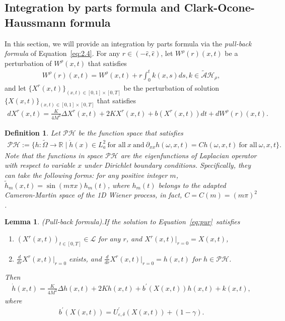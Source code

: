 \documentclass[11pt]{article}
\numberwithin{equation}{section}%
\numberwithin{figure}{section}%
\newtheorem{lemma}[theorem]{Lemma}
\newtheorem{definition}[theorem]{Definition}
\theoremstyle{remark}
\begin{document}
	\subsection{Integration by parts formula and Clark-Ocone-Haussmann formula}\label{sec:4.1}
	In this section, we will provide an integration by parts formula via the \emph{pull-back formula} of Equation~\eqref{eq:2.4}. For any $r\in(-\hat{\epsilon},\hat{\epsilon})$, let $W^{\rho}(r)(x,t)$ be a perturbation of $W^{\rho}(x,t)$ that satisfies
	\begin{align*}
		W^{\rho}(r)(x,t)=W^{\rho}(x,t)+r\int_{0}^{t}k(x,s)ds, k\in\tilde{\mathcal{A}}\mathcal{H}_{\rho},
	\end{align*}
	and let $\{X^{r}(x,t)\}_{(x,t)\in [0,1]\times [0,T]}$ be the perturbation of solution $\{X(x,t)\}_{(x,t)\in [0,1]\times [0,T]}$ that satisfies
	\begin{align}\label{eq:pur}
		d X^{r}(x,t)=\frac{K}{4M^{2}}\Delta X^{r}(x,t)+2K X^{r}(x,t)+b(X^{r}(x,t))dt+ dW^{\rho}(r)(x,t).
	\end{align}
	\begin{definition}\label{def:tanpro} 
		Let $ \mathcal{PH}$ be the function space that satisfies 
	\begin{align*}
		\mathcal{PH}:=\{h:\tilde{\Omega}\rightarrow\mathbb{R}\mid\dot{h}(x)\in	L_{a}^{2} \ \text{for all}\ x\ \text{and}\ \partial_{xx}h(\omega,x,t)=C h(\omega,x,t)\ \text{for all}\ \omega,x,t\}.
	\end{align*}
	Note that the functions in space $\mathcal{PH}$ are the eigenfunctions of Laplacian operator  with respect to variable $x$ under Dirichlet boundary conditions. Specifically, they can take the following forms: for any positive integer $m$, $\tilde{h}_{m}(x,t)=\sin{(m\pi x)}h_{m}(t)$, where $h_{m}(t)$ belongs to the adapted Cameron-Martin space of the 1D Wiener process, in fact, $C=C(m)=(m\pi)^{2}$.
\end{definition} 
	\begin{lemma}(Pull-back formula).\label{lem:23}
		If the solution to Equation~\eqref{eq:pur}~satisfies 
		\begin{enumerate}[{\rm (i)}]
			\item $(X^{r}(x,t))_{t\in[0,T]}\in \mathcal{L}$ for any $r$, and $X^{r}(x,t)|_{r=0}=X(x,t)$,
			\item $\frac{d}{dr}X^{r}(x,t)|_{r=0}$ exists, and $\frac{d}{dr}X^{r}(x,t)|_{r=0}=h(x,t)$ for $h\in\mathcal{PH}$.
		\end{enumerate}
		Then
		\begin{align*}
			\dot{h}(x,t)=\frac{K}{4M^{2}}\Delta h(x,t)+2K h(x,t) +b^{\prime}(X(x,t))h(x,t)+
			k(x,t),
		\end{align*}
		where
		\begin{align*}
		b^{\prime}(X(x,t))= U^{\prime}_{\varepsilon,\delta}(X(x,t))+(1-\gamma).
 		\end{align*}
	\end{lemma}
\end{document}
